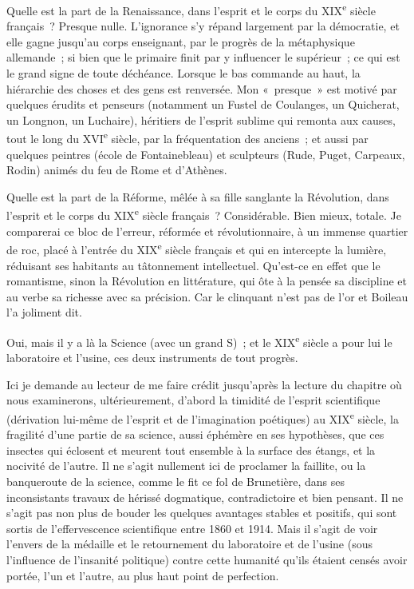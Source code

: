 \documentclass[french,twoside]{book} %
\begin{document}
Quelle est la part de la Renaissance, dans l’esprit et le corps du XIX\textsuperscript{e} siècle français ? Presque nulle. L’ignorance s’y répand largement par la démocratie, et elle gagne jusqu’au corps enseignant, par le progrès de la métaphysique allemande ; si bien que le primaire finit par y influencer le supérieur ; ce qui est le grand signe de toute déchéance. Lorsque le bas commande au haut, la hiérarchie des choses et des gens est renversée. Mon « presque » est motivé par quelques érudits et penseurs (notamment un Fustel de Coulanges, un Quicherat, un Longnon, un Luchaire), héritiers de l’esprit sublime qui remonta aux causes, tout le long du XVI\textsuperscript{e} siècle, par la fréquentation des anciens ; et aussi par quelques peintres (école de Fontainebleau) et sculpteurs (Rude, Puget, Carpeaux, Rodin) animés du feu de Rome et d’Athènes.\par
Quelle est la part de la Réforme, mêlée à sa fille sanglante la Révolution, dans l’esprit et le corps du XIX\textsuperscript{e} siècle français ? Considérable. Bien mieux, totale. Je comparerai ce bloc de l’erreur, réformée et révolutionnaire, à un immense quartier de roc, placé à l’entrée du XIX\textsuperscript{e} siècle français et qui en intercepte la lumière, réduisant ses habitants au tâtonnement intellectuel. Qu’est-ce en effet que le romantisme, sinon la Révolution en littérature, qui ôte à la pensée sa discipline et au verbe sa richesse avec sa précision. Car le clinquant n’est pas de l’or et Boileau l’a joliment dit.\par
Oui, mais il y a là la Science (avec un grand S) ; et le XIX\textsuperscript{e} siècle a pour lui le laboratoire et l’usine, ces deux instruments de tout progrès.\par
Ici je demande au lecteur de me faire crédit jusqu’après la lecture du chapitre où nous examinerons, ultérieurement, d’abord la timidité de l’esprit scientifique (dérivation lui-même de l’esprit et de l’imagination poétiques) au XIX\textsuperscript{e} siècle, la fragilité d’une partie de sa science, aussi éphémère en ses hypothèses, que ces insectes qui éclosent et meurent tout ensemble à la surface des étangs, et la nocivité de l’autre. Il ne s’agit nullement ici de proclamer la faillite, ou la banqueroute de la science, comme le fit ce fol de Brunetière, dans ses inconsistants travaux de hérissé dogmatique, contradictoire et bien pensant. Il ne s’agit pas non plus de bouder les quelques avantages stables et positifs, qui sont sortis de l’effervescence scientifique entre 1860 et 1914. Mais il s’agit de voir l’envers de la médaille et le retournement du laboratoire et de l’usine (sous l’influence de l’insanité politique) contre cette humanité qu’ils étaient censés avoir portée, l’un et l’autre, au plus haut point de perfection.\par
\end{document}
